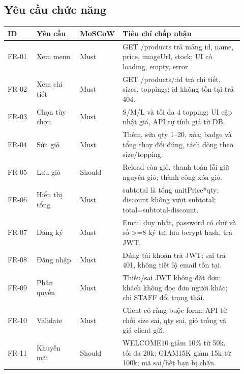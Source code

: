 \documentclass[a4paper,12pt,oneside]{report}
\begin{document}
\subsection{Yêu cầu chức năng}
\begingroup\fontsize{9}{11}\selectfont\setlength{\tabcolsep}{3pt}\renewcommand{\arraystretch}{1.35}
\begin{longtable}{@{}>{\raggedright\arraybackslash}p{0.12\linewidth} >{\raggedright\arraybackslash}p{0.18\linewidth} >{\raggedright\arraybackslash}p{0.12\linewidth} >{\raggedright\arraybackslash}p{0.5\linewidth}@{}}
\toprule
\textbf{ID} & \textbf{Yêu cầu} & \textbf{MoSCoW} & \textbf{Tiêu chí chấp nhận} \\
\midrule\endhead
FR-01 & Xem menu & Must & GET /\allowbreak{}products trả mảng id, name, price, imageUrl, stock; UI có loading, empty, error. \\
\addlinespace[2pt]
FR-02 & Xem chi tiết & Must & GET /\allowbreak{}products/\allowbreak{}:id trả chi tiết, sizes, toppings; id không tồn tại trả 404. \\
\addlinespace[2pt]
FR-03 & Chọn tùy chọn & Must & S/\allowbreak{}M/\allowbreak{}L và tối đa 4 topping; UI cập nhật giá, API tự tính giá từ DB. \\
\addlinespace[2pt]
FR-04 & Sửa giỏ & Must & Thêm, sửa qty 1–20, xóa; badge và tổng thay đổi đúng, tách dòng theo size/\allowbreak{}topping. \\
\addlinespace[2pt]
FR-05 & Lưu giỏ & Should & Reload còn giỏ, thanh toán lỗi giữ nguyên giỏ; thành công xóa giỏ. \\
\addlinespace[2pt]
FR-06 & Hiển thị tổng & Must & subtotal là tổng unitPrice*qty; discount không vượt subtotal; total=subtotal-discount. \\
\addlinespace[2pt]
FR-07 & Đăng ký & Must & Email duy nhất, password có chữ và số >=8 ký tự, lưu bcrypt hash, trả JWT. \\
\addlinespace[2pt]
FR-08 & Đăng nhập & Must & Đúng tài khoản trả JWT; sai trả 401, không tiết lộ email tồn tại. \\
\addlinespace[2pt]
FR-09 & Phân quyền & Must & Thiếu/\allowbreak{}sai JWT không đặt đơn; khách không đọc đơn người khác; chỉ STAFF đổi trạng thái. \\
\addlinespace[2pt]
FR-10 & Validate & Must & Client có ràng buộc form; API từ chối size sai, qty sai, giỏ trống và giá client gửi. \\
\addlinespace[2pt]
FR-11 & Khuyến mãi & Should & WELCOME10 giảm 10\% từ 50k, tối đa 20k; GIAM15K giảm 15k từ 100k; mã sai/\allowbreak{}hết hạn bị chặn. \\

\end{longtable}
\end{document}
